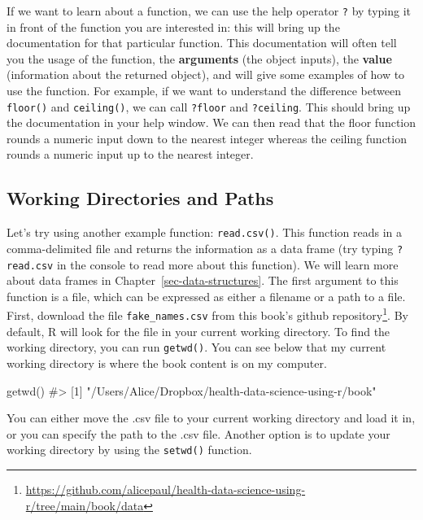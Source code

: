 \documentclass[
  letterpaper,
]{krantz}
\makeatletter
\newenvironment{Shaded}{\begin{snugshade}}{\end{snugshade}}
\newcommand{\CommentTok}[1]{\textcolor[rgb]{0.37,0.37,0.37}{#1}}
\newcommand{\FunctionTok}[1]{\textcolor[rgb]{0.28,0.35,0.67}{#1}}
\newcommand{\NormalTok}[1]{\textcolor[rgb]{0.00,0.23,0.31}{#1}}
\renewcommand{\href}[2]{#2\footnote{\url{#1}}}
\newenvironment{kframe}{%
\medskip{}
\setlength{\fboxsep}{.8em}
 \def\at@end@of@kframe{}%
 \ifinner\ifhmode%
  \def\at@end@of@kframe{\end{minipage}}%
  \begin{minipage}{\columnwidth}%
 \fi\fi%
 \def\FrameCommand##1{\hskip\@totalleftmargin \hskip-\fboxsep
 \colorbox{shadecolor}{##1}\hskip-\fboxsep
     \hskip-\linewidth \hskip-\@totalleftmargin \hskip\columnwidth}%
 \MakeFramed {\advance\hsize-\width
   \@totalleftmargin\z@ \linewidth\hsize
   \@setminipage}}%
 {\par\unskip\endMakeFramed%
 \at@end@of@kframe}
\renewenvironment{Shaded}{\begin{kframe}}{\end{kframe}}
\makeatother
\begin{document}
If we want to learn about a function, we can use the help operator
\texttt{?} by typing it in front of the function you are interested in:
this will bring up the documentation for that particular function. This
documentation will often tell you the usage of the function, the
\textbf{arguments} (the object inputs), the \textbf{value} (information
about the returned object), and will give some examples of how to use
the function. For example, if we want to understand the difference
between \texttt{floor()} and \texttt{ceiling()}, we can call
\texttt{?floor} and \texttt{?ceiling}. This should bring up the
documentation in your help window. We can then read that the floor
function rounds a numeric input down to the nearest integer whereas the
ceiling function rounds a numeric input up to the nearest integer.

\subsection{Working Directories and
Paths}\label{working-directories-and-paths}

Let's try using another example function: \texttt{read.csv()}. This
function reads in a comma-delimited file and returns the information as
a data frame (try typing \texttt{?read.csv} in the console to read more
about this function). We will learn more about data frames in
Chapter~\ref{sec-data-structures}. The first argument to this function
is a file, which can be expressed as either a filename or a path to a
file. First, download the file \texttt{fake\_names.csv} from this book's
\href{https://github.com/alicepaul/health-data-science-using-r/tree/main/book/data}{github
repository}. By default, R will look for the file in your current
working directory. To find the working directory, you can run
\texttt{getwd()}. You can see below that my current working directory is
where the book content is on my computer.

\begin{Shaded}
\begin{Highlighting}[]
\FunctionTok{getwd}\NormalTok{()}
\CommentTok{\#\textgreater{} [1] "/Users/Alice/Dropbox/health{-}data{-}science{-}using{-}r/book"}
\end{Highlighting}
\end{Shaded}

You can either move the .csv file to your current working directory and
load it in, or you can specify the path to the .csv file. Another option
is to update your working directory by using the \texttt{setwd()}
function.
\end{document}
